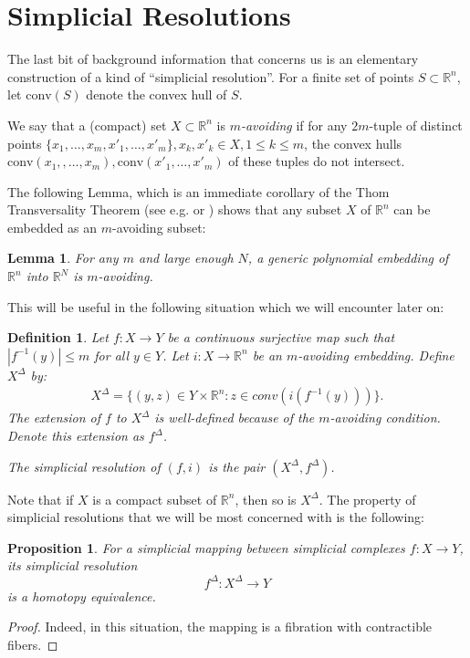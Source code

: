 \documentclass{amsart}
\newcommand{\R}{{\mathbb R}}
\newcommand{\conv}{{\mathrm{conv}}}
\newtheorem{lemma}[theorem]{Lemma}
\newtheorem{proposition}[theorem]{Proposition}
\newtheorem{defin}{Definition}
\begin{document}
\section{Simplicial Resolutions}



The last bit of background information that concerns us is an elementary construction of a kind of ``simplicial resolution''. For a finite set of points $S \subset \R^n$, let $\conv(S)$ denote the convex hull of $S$.

We say that a (compact) set $X\subset\R^n$ is \emph{$m$-avoiding}  if for any $2m$-tuple of distinct points $\{x_1,\ldots,x_m, x'_1,\ldots,x'_m\}, x_k,x'_k\in X, 1\leq k\leq m$, the convex hulls $\conv(x_1,,\ldots,x_m), \conv(x'_1,\ldots,x'_m)$ of these tuples do not intersect.

The following Lemma, which is an immediate corollary of the Thom Transversality Theorem (see e.g. \cite[Chapter 3]{Hirsch} or \cite[Chapter 4]{Wall}) shows that any subset $X$ of $\R^n$ can be embedded as an $m$-avoiding subset: 
\begin{lemma}
For any $m$ and large enough $N$, a generic polynomial embedding of $\R^n$ into  $\R^N$ is $m$-avoiding.
\end{lemma}

This will be useful in the following situation which we will encounter later on:

\begin{defin}\label{def:simplres}
  Let $f : X \to Y$ be a continuous surjective map such that $|f^{-1}(y)|\leq m$ for all $y \in Y$.
  Let $i : X \to \R^n$ be an $m$-avoiding embedding. Define $X^{\Delta}$ by:
\begin{align*}
X^{\Delta} = \{ (y, z) \in Y \times \R^n : z \in conv(i(f^{-1}(y))) \}.
\end{align*}
The extension of $f$ to $X^{\Delta}$ is well-defined because of 
the $m$-avoiding condition.  Denote this extension as $f^{\Delta}$.

The \emph{simplicial resolution} of $(f, i)$ is the pair $(X^{\Delta}, f^{\Delta})$.
\end{defin}

Note that if $X$ is a compact subset of $\R^n$, then so is $X^{\Delta}$.
The property of simplicial resolutions that we will be most concerned with is the following:
\begin{proposition}
\label{simp_res}
For a simplicial mapping between simplicial complexes $f:X\to Y$, its simplicial resolution
$$
f^\Delta:X^\Delta\to Y
$$
is a homotopy equivalence.
\end{proposition}
\begin{proof}
  Indeed, in this situation, the mapping is a fibration with contractible fibers.
  \end{proof}
\end{document}
